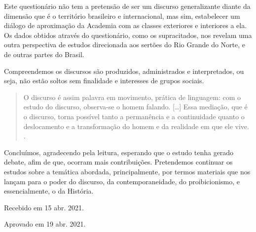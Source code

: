 \begin{refsection}
    Este questionário não tem a pretensão de ser um discurso generalizante diante da dimensão que é o território brasileiro e internacional, mas sim, estabelecer um diálogo de aproximação da Academia com as classes exteriores e interiores a ela. Os dados obtidos através do questionário, como os supracitados, nos revelam uma outra perspectiva de estudos direcionada aos sertões do Rio Grande do Norte, e de outras partes do Brasil. 

    Compreendemos os discursos são produzidos, administrados e interpretados, ou seja, não estão soltos sem finalidade e interesses de grupos sociais. 

    \begin{quotation}
        O discurso é assim palavra em movimento, prática de linguagem: com o estudo do discurso, observa-se o homem falando. [\dots] Essa mediação, que é o discurso, torna possível tanto a permanência e a continuidade quanto o deslocamento e a transformação do homem e da realidade em que ele vive. \cite[p.~15]{Orlandi1999Analise}.
    \end{quotation}

    Concluímos, agradecendo pela leitura, esperando que o estudo tenha gerado debate, afim de que, ocorram mais contribuições. Pretendemos continuar os estudos sobre a temática abordada, principalmente, por termos materiais que nos lançam para o poder do discurso, da contemporaneidade, do proibicionismo, e essencialmente, o da História.

    \nocite{AmadoAndFerreira2006Usos}
    \nocite{LoBianco2016}
    \nocite{Foucault2005Arqueologia}

    \printbibliography[heading=subbibliography,notcategory=fullcited]

    \hfill Recebido em 15 abr. 2021.

    \hfill Aprovado em 19 abr. 2021.

    \label{chap:contextosubsend}

\end{refsection}
